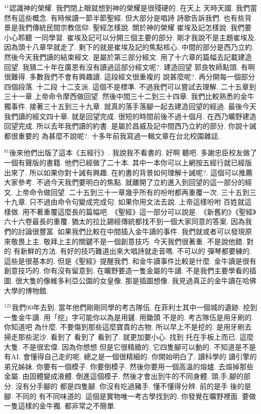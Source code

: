 \documentclass{book}
\begin{document}
$^{41}$認識神的榮耀.
我們閉上眼就想到神的榮耀是很殘硬的.
在天上 天時天國.
我們當然有這些概念.
有時候讀一節半節聖經.
但大部分是唱詩 詩歌告訴我們.
也有些背景是我們傳統民間宗教信仰.
聖經怎樣說.
關於神的榮耀 崔埃及記怎樣說.
我們要小心聆聽 一同學習.
崔埃及記可以分開三個主要的部分.
剛才我說不是主題崔埃及.
因為頭十八章早就走了.
剩下的就是崔埃及記的焦點核心.
中間的部分是西乃立約.
然後今天我們讀的結束經文.
是屬於第三部分經文.
用了十六章的篇幅去記載建造回望.
我猜二十年在廣恩有沒有讀過這部分經文呢?.
建造回望 郭良牧師點頭.
有啊 很難得.
多數我們不會有興趣讀.
這段經文很重複的 說甚麼呢?.
再分開每一個部分四個段落.
十二段 十二支派.
這個不是標準.
不過我們可以嘗試去理解.
二十五章到三十一章 上帝命令摩西做回望.
然後中間三十二到三十四章.
我們比較熟悉的金牛獨事件.
接著三十五到三十九章.
就真的落手落腳一起去建造回望的經過.
最後今天我們讀的經文四十章.
就是回望完成.
很短的時間前後不過十個月.
在西乃曠野建造回望完成.
所以去年我們讀的約書.
是屬於昌威及記中間西乃立約的部分.
你說十誡都很重要的 為甚麼不說呢?.
十多年前我寫過一輯文章在台北校園雜誌.

$^{81}$後來他們出版了這本《五經行》.
我說我不看書的.
好啊 聽吧.
多謝忠臣校友做了一個有聲版的書籍.
他們已經做了二十本.
其中一本你可以上網按五經行就已經版出來了.
所以如果你對十誡有興趣.
在約書的背景如何理解十誡呢?.
這個可以推薦大家參考.
不過今天我們要明白的焦點.
就離開了立約進入到回望的這一部分的經文.
上帝命令做回望.
二十五到三十一章幾乎所有的吩咐都再重覆一次.
三十五到三十九章.
只不過由命令句變成完成句.
如果你用文法去說.
上帝這樣吩咐 百姓就這樣做.
用不著重覆這麼長的篇幅吧.
《聖經》這一部分可以說是.
《新舊約》《聖經》六十六卷最長的重覆.
猶太的拉比錫經傳統都找不到一個大家同意的答案.
因為我們的討論很豐富.
如果我們比較在中間插入金牛讀的事件.
我們就或者可以發現原來敬畏上主.
敬拜上主的關鍵不是一個創意技巧.
今天我們很著重.
不是說他錯.
對的 有新鮮的方法.
有好的技巧難道出來大唱詩就走音嗎.
不可以的 彈琴都要練的.
這些是很基本的.
但是《聖經》提醒我們.
和金牛讀事件比較是什麼.
金牛讀是很有創意技巧的.
你有沒有留意到.
在曠野要造一隻金屬的牛讀.
不是我們主要學看的插圖.
很大隻的像維多利亞公園的女皇像.
那是插圖想像.
我見過真正的金牛讀在哈佛大學的博物館.

$^{121}$我們90年去到.
當年他們剛剛同學的考古隊伍.
在菲利士其中一個城的遺跡.
挖到一隻金牛讀.
用「挖」字可能你以為是用鏟.
用鋤頭 不是的.
考古隊伍是用牙刷的.
你知道吧 為什麼.
不要傷到那些這麼寶貴的古物.
所以早上不是挖的.
是用牙刷去掃走那些泥沙.
看到了 看到了 看到了.
就更加要小心.
找到 托在手板上而已.
這麼大隻.
不是很宏偉.
因為你想想 但是它很精緻的.
它四隻腳可以動的.
不知道是不是有AI.
會懂得自己走的呢.
總之是一個很精細的.
你開始明白了.
讀科學的 讀引擎的弟兄姊妹.
你要有一個模子.
你要倒模子.
然後你要用一個高溫的熔爐.
去熔掉那些金屬.
由固體變成液體.
倒進這個模子.
然後才會出到牛的不同身體.
頭,手,腳的部分.
沒有分手腳的 都是四隻腳.
你沒有吃過豬手.
懂不懂得分辨.
前的是手 後的是腳.
不同的 有不同味道的.
這個是實物唯一考古學找到的.
你發覺在曠野裡面.
要做一隻這樣的金牛獨.
都非常之不簡單.
\end{document}
